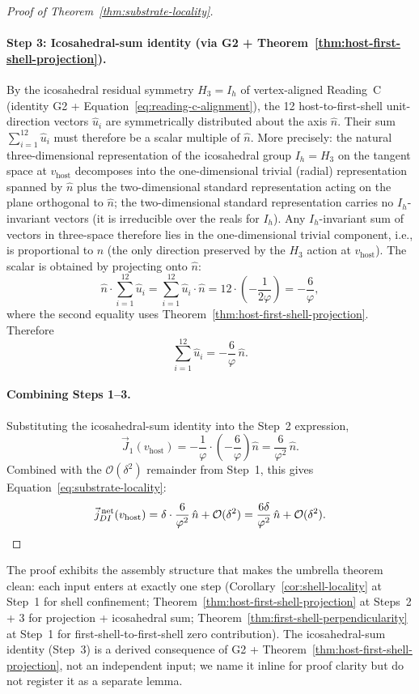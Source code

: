 \documentclass[11pt,letterpaper]{article}
\newcommand{\phig}{\varphi}
\newcommand{\vhost}{v_{\text{host}}}
\newcommand{\jDInet}{\vec{j}_{DI}^{\,\text{net}}}
\newcommand{\bigO}[1]{\mathcal{O}(#1)}
\begin{document}
\begin{proof}[Proof of Theorem~\ref{thm:substrate-locality}]
\paragraph{Step 3: Icosahedral-sum identity (via G2 + Theorem~\ref{thm:host-first-shell-projection}).}
By the icosahedral residual symmetry $H_3 = I_h$ of vertex-aligned Reading~C (identity G2 + Equation~\eqref{eq:reading-c-alignment}), the 12 host-to-first-shell unit-direction vectors $\hat{u}_i$ are symmetrically distributed about the axis $\hat{n}$. Their sum $\sum_{i=1}^{12} \hat{u}_i$ must therefore be a scalar multiple of $\hat{n}$. More precisely: the natural three-dimensional representation of the icosahedral group $I_h = H_3$ on the tangent space at $\vhost$ decomposes into the one-dimensional trivial (radial) representation spanned by $\hat{n}$ plus the two-dimensional standard representation acting on the plane orthogonal to $\hat{n}$; the two-dimensional standard representation carries no $I_h$-invariant vectors (it is irreducible over the reals for $I_h$). Any $I_h$-invariant sum of vectors in three-space therefore lies in the one-dimensional trivial component, i.e., is proportional to $\hat{n}$ (the only direction preserved by the $H_3$ action at $\vhost$). The scalar is obtained by projecting onto $\hat{n}$:
\[
\hat{n} \cdot \sum_{i=1}^{12} \hat{u}_i = \sum_{i=1}^{12} \hat{u}_i \cdot \hat{n} = 12 \cdot \left(-\frac{1}{2\phig}\right) = -\frac{6}{\phig},
\]
where the second equality uses Theorem~\ref{thm:host-first-shell-projection}. Therefore
\[
\sum_{i=1}^{12} \hat{u}_i = -\frac{6}{\phig} \, \hat{n}.
\]

\paragraph{Combining Steps 1--3.}
Substituting the icosahedral-sum identity into the Step~2 expression,
\[
\vec{J}_1(\vhost) = -\frac{1}{\phig} \cdot \left(-\frac{6}{\phig}\right) \hat{n} = \frac{6}{\phig^2} \, \hat{n}.
\]
Combined with the $\bigO{\delta^2}$ remainder from Step~1, this gives Equation~\eqref{eq:substrate-locality}:
\[
\jDInet(\vhost) = \delta \cdot \frac{6}{\phig^2} \, \hat{n} + \bigO{\delta^2} = \frac{6\delta}{\phig^2} \, \hat{n} + \bigO{\delta^2}. \qedhere
\]
\end{proof}

The proof exhibits the assembly structure that makes the umbrella theorem clean: each input enters at exactly one step (Corollary~\ref{cor:shell-locality} at Step~1 for shell confinement; Theorem~\ref{thm:host-first-shell-projection} at Steps~2 + 3 for projection + icosahedral sum; Theorem~\ref{thm:first-shell-perpendicularity} at Step~1 for first-shell-to-first-shell zero contribution). The icosahedral-sum identity (Step~3) is a derived consequence of G2 + Theorem~\ref{thm:host-first-shell-projection}, not an independent input; we name it inline for proof clarity but do not register it as a separate lemma.
\end{document}
